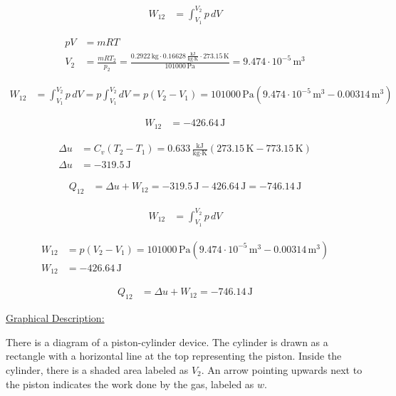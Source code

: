 \begin{align*}
    W_{12} &= \int_{V_1}^{V_2} p \, dV
\end{align*}

\begin{align*}
    pV &= mRT \\
    V_2 &= \frac{mRT_2}{p_2} = \frac{0.2922 \, \text{kg} \cdot 0.16628 \, \frac{\text{kJ}}{\text{kg} \cdot \text{K}} \cdot 273.15 \, \text{K}}{101000 \, \text{Pa}} = 9.474 \cdot 10^{-5} \, \text{m}^3
\end{align*}

\begin{align*}
    W_{12} &= \int_{V_1}^{V_2} p \, dV = p \int_{V_1}^{V_2} dV = p (V_2 - V_1) = 101000 \, \text{Pa} \left(9.474 \cdot 10^{-5} \, \text{m}^3 - 0.00314 \, \text{m}^3 \right)
\end{align*}

\begin{align*}
    W_{12} &= -426.64 \, \text{J}
\end{align*}

\begin{align*}
    \Delta u &= C_v (T_2 - T_1) = 0.633 \, \frac{\text{kJ}}{\text{kg} \cdot \text{K}} (273.15 \, \text{K} - 773.15 \, \text{K}) \\
    \Delta u &= -319.5 \, \text{J}
\end{align*}

\begin{align*}
    Q_{12} &= \Delta u + W_{12} = -319.5 \, \text{J} - 426.64 \, \text{J} = -746.14 \, \text{J}
\end{align*}

\begin{align*}
    W_{12} &= \int_{V_1}^{V_2} p \, dV
\end{align*}

\begin{align*}
    W_{12} &= p (V_2 - V_1) = 101000 \, \text{Pa} \left(9.474 \cdot 10^{-5} \, \text{m}^3 - 0.00314 \, \text{m}^3 \right) \\
    W_{12} &= -426.64 \, \text{J}
\end{align*}

\begin{align*}
    Q_{12} &= \Delta u + W_{12} = -746.14 \, \text{J}
\end{align*}

\underline{Graphical Description:}

There is a diagram of a piston-cylinder device. The cylinder is drawn as a rectangle with a horizontal line at the top representing the piston. Inside the cylinder, there is a shaded area labeled as $V_2$. An arrow pointing upwards next to the piston indicates the work done by the gas, labeled as $w$.

